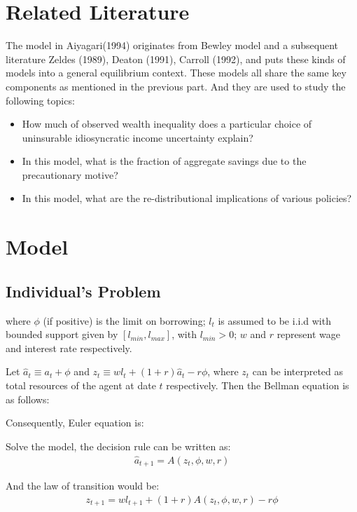 \documentclass[]{article}
\providecommand{\EqDir}{Equations}
\begin{document}
\section{Related Literature}
The model in Aiyagari(1994) originates from Bewley model and a subsequent literature Zeldes (1989), Deaton (1991), Carroll (1992), and puts these kinds of models into a general equilibrium context. These models all share the same key components as mentioned in the previous part. And they are used to study the following topics:
\begin{itemize}
	\item How much of observed wealth inequality does a particular choice of uninsurable idiosyncratic income uncertainty explain? 
	\item In this model, what is the fraction of aggregate savings due to the precautionary motive? 
	\item In this model, what are the re-distributional implications of various policies?
\end{itemize}

\section{Model}
\subsection{Individual's Problem}


where $\phi$ (if positive) is the limit on borrowing; $l_t$ is assumed to be i.i.d with bounded support given by $[l_{min},l_{max}]$, with $l_{min}>0$; $w$ and $r$ represent wage and interest rate respectively.

Let $\hat{a}_t \equiv a_t+\phi$ and $z_t \equiv wl_t+(1+r)\hat{a}_t-r\phi$, where $z_t$ can be interpreted as total resources of the agent at date $t$ respectively. 
Then the Bellman equation is as follows:


Consequently, Euler equation is: 


Solve the model, the decision rule can be written as: 
\begin{align}
	\hat{a}_{t+1}=A(z_t,\phi,w,r)
\end{align}

And the law of transition would be:
\begin{align}
	z_{t+1}=wl_{t+1}+(1+r)A(z_t,\phi,w,r)-r\phi
\end{align}
\end{document}
